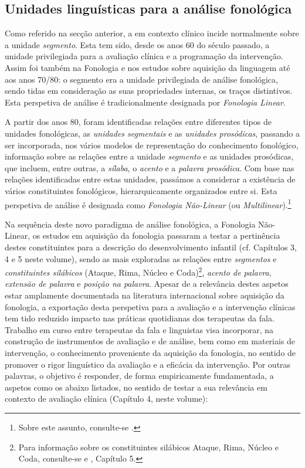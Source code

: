 \documentclass[output=paper]{LSP/langsci}
\begin{document}
\subsection{Unidades linguísticas para a análise fonológica}
\label{subsec:lousada_unidades}

Como referido na secção anterior, a  em contexto clínico incide normalmente sobre a unidade \textit{segmento}. Esta tem sido, desde os anos 60 do século passado, a unidade privilegiada para a avaliação clínica e a programação da intervenção. Assim foi também na Fonologia e nos estudos sobre aquisição da linguagem até aos anos 70/80: o segmento era a unidade privilegiada de análise fonológica, sendo tidas em consideração as suas propriedades internas, os traços distintivos. Esta perspetiva de análise é tradicionalmente designada por \textit{Fonologia Linear}. 

A partir dos anos 80, foram identificadas relações entre diferentes tipos de unidades fonológicas, as \textit{unidades segmentais} e as \textit{unidades prosódicas}, passando a ser incorporada, nos vários modelos de representação do conhecimento fonológico, informação sobre as relações entre a unidade \textit{segmento} e as unidades prosódicas, que incluem, entre outras, a \textit{sílaba}, o \textit{acento} e a \textit{palavra prosódica}. Com base nas relações identificadas entre estas unidades, passámos a considerar a existência de vários constituintes fonológicos, hierarquicamente organizados entre si. Esta perspetiva de análise é designada como \textit{Fonologia Não-Linear} (ou \textit{Multilinear}).\footnote{Sobre este assunto, consulte-se \citet{mateus_etal2005}.}

Na sequência deste novo paradigma de análise fonológica, a Fonologia Não-Linear, os estudos em aquisição da fonologia passaram a testar a pertinência destes constituintes para a descrição do desenvolvimento infantil (cf. Capítulos 3, 4 e 5 neste volume), sendo as mais exploradas as relações entre \textit{segmentos} e \textit{constituintes silábicos} (Ataque, Rima, Núcleo e Coda)\footnote{Para informação sobre os constituintes silábicos Ataque, Rima, Núcleo e Coda, consulte-se \citet{mateus_etal2005} e \citet{freitassantos2001}, Capítulo 5.}, \textit{acento de palavra}, \textit{extensão de palavra} e \textit{posição na palavra}. Apesar de a relevância destes aspetos estar amplamente documentada na literatura internacional sobre aquisição da fonologia, a exportação desta perspetiva para a avaliação e a intervenção clínicas \citep{bernhardtstemberger2000} tem tido reduzido impacto nas práticas quotidianas dos terapeutas da fala. Trabalho em curso entre terapeutas da fala e linguistas visa incorporar, na construção de instrumentos de avaliação e de análise, bem como em materiais de intervenção, o conhecimento proveniente da aquisição da fonologia, no sentido de promover o rigor linguístico da avaliação e a eficácia da intervenção. Por outras palavras, o objetivo é responder, de forma empiricamente fundamentada, a aspetos como os abaixo listados, no sentido de testar a sua relevância em contexto de avaliação clínica (Capítulo 4, neste volume):\largerpage
\end{document}

